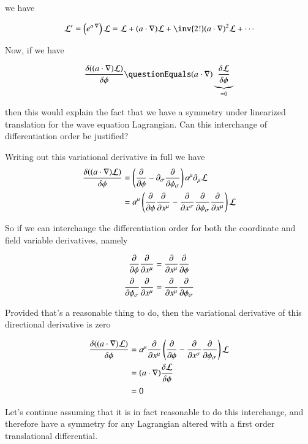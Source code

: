 \documentclass{article}
\begin{document}
we have

\begin{align*}
\LL' = \left( e^{a \cdot \grad}\right) \LL = \LL + (a \cdot \grad)\LL + \inv{2!}(a \cdot \grad)^2 \LL + \cdots
\end{align*}

Now, if we have

\begin{align*}
\frac{\delta ((a \cdot \grad) \LL)}{\delta \phi} 
&
\questionEquals
(a \cdot \grad) \underbrace{\frac{\delta \LL}{\delta \phi}}_{=0} \\
\end{align*}

then this would explain the fact that we have a symmetry under linearized translation for the wave equation Lagrangian.  Can this interchange
of differentiation order be justified?

Writing out this variational derivative in full we have
\begin{align*}
\frac{\delta ((a \cdot \nabla) \mathcal{L})}{\delta \phi} 
&=
\left( \frac{\partial {}}{\partial {\phi}} - \partial_\sigma \frac{\partial {}}{\partial {\phi_\sigma}} \right) a^\mu \partial_\mu \mathcal{L} \\
&=
a^\mu \left( 
\frac{\partial {}}{\partial {\phi}} \frac{\partial {}}{\partial {x^\mu}} 
 - \frac{\partial {}}{\partial {x^\sigma}} \frac{\partial {}}{\partial {\phi_\sigma}} \frac{\partial {}}{\partial {x^\mu}} 
\right) 
\mathcal{L} \\
\end{align*}

So if we can interchange the differentiation order for both the coordinate and field variable derivatives, namely

\begin{align*}
\frac{\partial {}}{\partial {\phi}} \frac{\partial {}}{\partial {x^\mu}} &= \frac{\partial {}}{\partial {x^\mu}} \frac{\partial {}}{\partial {\phi}} \\
\frac{\partial {}}{\partial {\phi_\sigma}} \frac{\partial {}}{\partial {x^\mu}}  &= \frac{\partial {}}{\partial {x^\mu}} \frac{\partial {}}{\partial {\phi_\sigma}}
\end{align*}

Provided that's a reasonable thing to do, then the variational derivative of this directional derivative is zero 

\begin{align*}
\frac{\delta ((a \cdot \nabla) \mathcal{L})}{\delta \phi} 
&=
a^\mu \frac{\partial {}}{\partial {x^\mu}} 
\left( 
\frac{\partial {}}{\partial {\phi}} 
 - \frac{\partial {}}{\partial {x^\sigma}} \frac{\partial {}}{\partial {\phi_\sigma}} 
\right) 
\mathcal{L} \\
&=
(a \cdot \nabla) \frac{\delta \mathcal{L}}{\delta \phi} \\
&= 0
\end{align*}

Let's continue assuming that it is in fact reasonable to do this interchange, and therefore have a symmetry for any Lagrangian 
altered with a first order translational differential.
\end{document}
